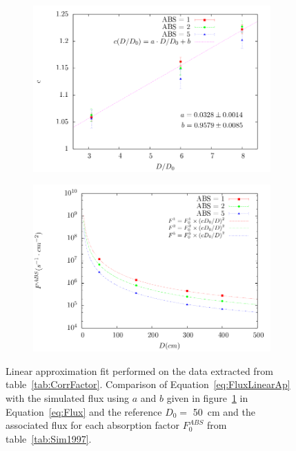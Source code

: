 	\begin{figure}[H]
		\begin{subfigure}{\linewidth}
			\centering
			\includegraphics[width = .6\linewidth]{fig/chapt5/flux_correction.pdf}\\
			\caption{\label{fig:CorrFactor:A}}
		\end{subfigure}
		\begin{subfigure}{\linewidth}
			\centering
			\includegraphics[width = .6\linewidth]{fig/chapt5/correction_model.pdf}
			\caption{\label{fig:CorrFactor:B}}
		\end{subfigure}
		\caption{\label{fig:CorrFactor}  Linear approximation fit performed on the data extracted from table~\ref{tab:CorrFactor}.  Comparison of Equation~\ref{eq:FluxLinearAp} with the simulated flux using $a$ and $b$ given in figure~\ref{fig:CorrFactor:A} in Equation~\ref{eq:Flux} and the reference $D_0 =$ \SI{50}{cm} and the associated flux for each absorption factor $F_0^{ABS}$ from table~\ref{tab:Sim1997}.}
	\end{figure}
	
